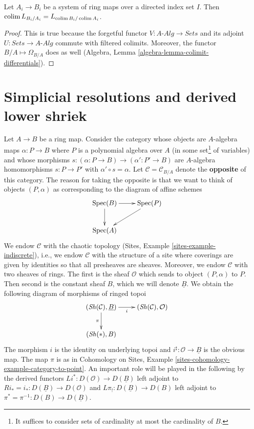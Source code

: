 \begin{lemma}
\label{lemma-colimit-cotangent-complex}
Let $A_i \to B_i$ be a system of ring maps over a directed index
set $I$. Then $\mathop{\mathrm{colim}}\nolimits L_{B_i/A_i} = L_{\mathop{\mathrm{colim}}\nolimits B_i/\mathop{\mathrm{colim}}\nolimits A_i}$.
\end{lemma}

\begin{proof}
This is true because the forgetful functor
$V : A\textit{-Alg} \to \textit{Sets}$ and its adjoint
$U : \textit{Sets} \to A\textit{-Alg}$ commute with filtered colimits.
Moreover, the functor $B/A \mapsto \Omega_{B/A}$ does as well
(Algebra, Lemma \ref{algebra-lemma-colimit-differentials}).
\end{proof}





\section{Simplicial resolutions and derived lower shriek}
\label{section-compute-L-pi-shriek}

\noindent
Let $A \to B$ be a ring map. Consider the category whose objects are
$A$-algebra maps $\alpha : P \to B$ where $P$ is a polynomial algebra over $A$
(in some set\footnote{It suffices to consider sets of cardinality
at most the cardinality of $B$.} of variables) and whose
morphisms $s : (\alpha : P \to B) \to (\alpha' : P' \to B)$ are
$A$-algebra homomorphisms $s : P \to P'$ with $\alpha' \circ s = \alpha$.
Let $\mathcal{C} = \mathcal{C}_{B/A}$ denote the {\bf opposite}
of this category. The reason for
taking the opposite is that we want to think of objects
$(P, \alpha)$ as corresponding to the diagram of affine schemes
$$
\xymatrix{
\Spec(B) \ar[d] \ar[r] & \Spec(P) \ar[ld] \\
\Spec(A)
}
$$
We endow $\mathcal{C}$ with the chaotic topology
(Sites, Example \ref{sites-example-indiscrete}), i.e., we endow
$\mathcal{C}$ with the structure of a site where coverings are given by
identities so that all presheaves are sheaves.
Moreover, we endow $\mathcal{C}$ with two sheaves of rings. The first
is the sheaf $\mathcal{O}$ which sends to object $(P, \alpha)$ to $P$.
Then second is the constant sheaf $B$, which we will denote
$\underline{B}$. We obtain the following diagram of morphisms of
ringed topoi
\begin{equation}
\label{equation-pi}
\vcenter{
\xymatrix{
(\Sh(\mathcal{C}), \underline{B}) \ar[r]_i \ar[d]_\pi &
(\Sh(\mathcal{C}), \mathcal{O}) \\
(\Sh(*), B)
}
}
\end{equation}
The morphism $i$ is the identity on underlying topoi and
$i^\sharp : \mathcal{O} \to \underline{B}$ is the obvious map.
The map $\pi$ is as in Cohomology on Sites, Example
\ref{sites-cohomology-example-category-to-point}.
An important role will be played in the following
by the derived functors
$
Li^* : D(\mathcal{O}) \longrightarrow D(\underline{B})
$
left adjoint to $Ri_* = i_* : D(\underline{B}) \to D(\mathcal{O})$ and
$
L\pi_! : D(\underline{B}) \longrightarrow D(B)
$
left adjoint to $\pi^* = \pi^{-1} : D(B) \to D(\underline{B})$.

